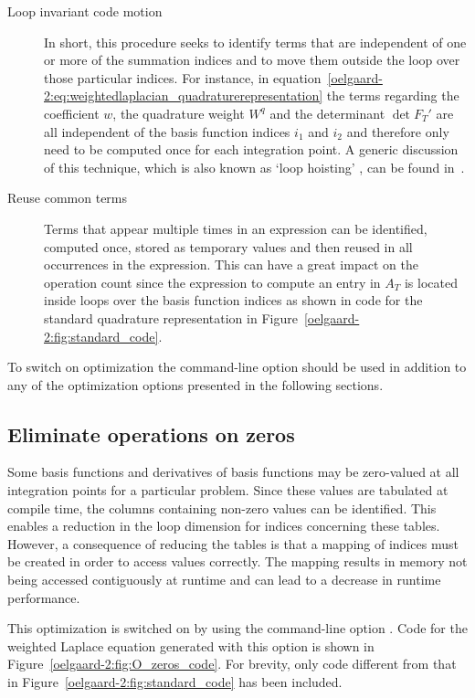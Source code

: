 \begin{description}
\item[Loop invariant code motion] In short, this procedure seeks to
  identify terms that are independent of one or more of the summation
  indices and to move them outside the loop over those particular
  indices.  For instance, in
  equation~\eqref{oelgaard-2:eq:weightedlaplacian_quadraturerepresentation}
  the terms regarding the coefficient $w$, the quadrature weight $W^q$
  and the determinant $\det F_T'$ are all independent of the basis
  function indices $i_1$ and $i_2$ and therefore only need to be
  computed once for each integration point.  A generic discussion of
  this technique, which is also known as `loop hoisting' , can be found in~\citet{AhoSethiUllman1986}.

\item[Reuse common terms] Terms that appear multiple times in an
  expression can be identified, computed once, stored as temporary
  values and then reused in all occurrences in the expression.  This can
  have a great impact on the operation count since the expression to
  compute an entry in $A_T$ is located inside loops over the basis
  function indices as shown in code for the standard quadrature
  representation in Figure~\ref{oelgaard-2:fig:standard_code}.
\end{description}

To switch on optimization the command-line option  should be
used in addition to any of the \ffc{} optimization options presented
in the following sections.

\subsection{Eliminate operations on zeros}
\label{oelgaard-2:sec:eliminate_zeros}

Some basis functions and derivatives of basis functions may be
zero-valued at all integration points for a particular problem.  Since
these values are tabulated at compile time, the columns containing
non-zero values can be identified.  This enables a reduction in the
loop dimension for indices concerning these tables.  However, a
consequence of reducing the tables is that a mapping of indices must
be created in order to access values correctly.  The mapping results
in memory not being accessed contiguously at runtime and can lead to a
decrease in runtime performance.

This optimization is switched on by using the command-line option
. Code for the weighted Laplace equation
generated with this option is shown in
Figure~\ref{oelgaard-2:fig:O_zeros_code}. For brevity, only code
different from that in Figure~\ref{oelgaard-2:fig:standard_code} has
been included.

